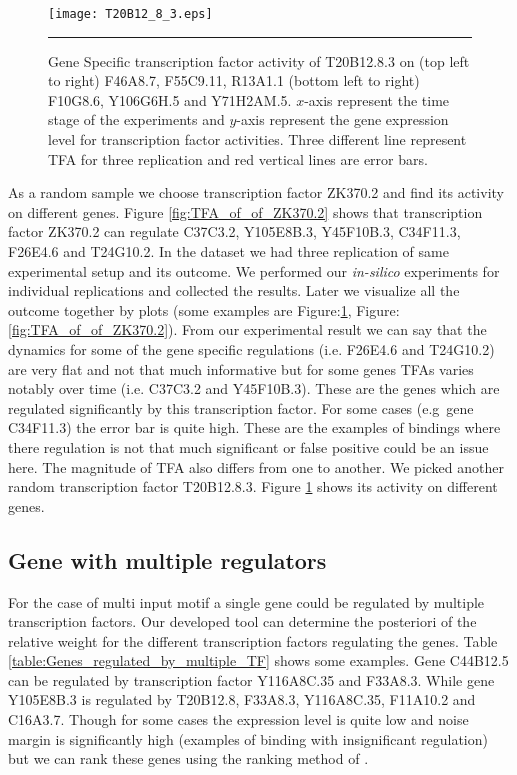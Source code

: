 \begin{figure}
	\centering
		\texttt{[image: T20B12\_8\_3.eps]}
		\rule{35em}{0.5pt}
	\caption[Gene Specific transcription factor activity of T20B12.8.3]
		{Gene Specific transcription factor activity of T20B12.8.3 on (top left to right) F46A8.7, F55C9.11, R13A1.1 (bottom left to right) F10G8.6, Y106G6H.5 and Y71H2AM.5. $x$-axis represent the time stage of the experiments and $y$-axis represent the gene expression level for transcription factor activities. Three different line represent TFA for three replication and red vertical lines are error bars.}
	\label{fig:TFA_of_of_T20B12_8_3}
\end{figure}

As a random sample we choose transcription factor ZK370.2 and find its activity on different genes. Figure \ref{fig:TFA_of_of_ZK370.2} shows that transcription factor ZK370.2 can regulate C37C3.2, Y105E8B.3, Y45F10B.3, C34F11.3, F26E4.6 and T24G10.2. In the dataset we had three replication of same experimental setup and its outcome. We performed our \textit{in-silico} experiments for individual replications and collected the results. Later we visualize all the outcome together by plots (some examples are Figure:\ref{fig:TFA_of_of_T20B12_8_3}, Figure:\ref{fig:TFA_of_of_ZK370.2}). From our experimental result we can say that the dynamics for some of the gene specific regulations (i.e. F26E4.6 and T24G10.2) are very flat and not that much informative but for some genes TFAs varies notably over time (i.e. C37C3.2 and Y45F10B.3). These are the genes which are regulated significantly by this transcription factor. For some cases (e.g\ gene C34F11.3) the error bar is quite high. These are the examples of bindings where there regulation is not that much significant or false positive could be an issue here. The magnitude of TFA also differs from one to another. We picked another random transcription factor T20B12.8.3. Figure \ref{fig:TFA_of_of_T20B12_8_3} shows its activity on different genes.


\subsection{Gene with multiple regulators}
For the case of multi input motif a single gene could be regulated by multiple transcription factors. Our developed tool can determine the posteriori of the relative weight for the different transcription
factors regulating the genes. Table \ref{table:Genes_regulated_by_multiple_TF} shows some examples. Gene C44B12.5 can be regulated by transcription factor Y116A8C.35 and F33A8.3. While gene
Y105E8B.3 is regulated by T20B12.8, F33A8.3, Y116A8C.35, F11A10.2 and C16A3.7. Though for some cases the expression level is quite low and noise margin is significantly high (examples of binding with insignificant regulation) but we can rank these genes using the ranking method of \cite{Kalaitzis:2011}.

